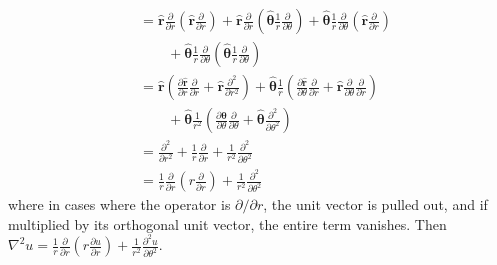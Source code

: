 \documentclass[a4paper]{article}
\begin{document}
\begin{enumerate}[label=(\alph*)]
\begin{align*}
		 & = \pmb{\hat{r}}\frac{\partial }{\partial r}\!\left( \pmb{\hat{r}}\frac{\partial }{\partial r} \right) + \pmb{\hat{r}}\frac{\partial }{\partial r}\!\left( \pmb{\hat{\theta}}\frac{1}{r}\frac{\partial }{\partial \theta} \right) + \pmb{\hat{\theta}}\frac{1}{r}\frac{\partial }{\partial \theta}\!\left( \pmb{\hat{r}}\frac{\partial }{\partial r} \right) \\ 
		 & \qquad + \pmb{\hat{\theta}}\frac{1}{r}\frac{\partial }{\partial \theta}\!\left( \pmb{\hat{\theta}}\frac{1}{r}\frac{\partial }{\partial \theta} \right) \\ 
		 & = \pmb{\hat{r}}\!\left( \frac{\partial \pmb{\hat{r}}}{\partial r}\frac{\partial }{\partial r} + \pmb{\hat{r}}\frac{\partial^2 }{\partial r^2} \right) + \pmb{\hat{\theta}}\frac{1}{r}\!\left( \frac{\partial \pmb{\hat{r}}}{\partial \theta}\frac{\partial }{\partial r} + \pmb{\hat{r}}\frac{\partial }{\partial \theta}\frac{\partial }{\partial r} \right) \\
		 & \qquad + \pmb{\hat{\theta}}\frac{1}{r^2}\!\left( \frac{\partial \pmb{\hat{\theta}}}{\partial \theta}\frac{\partial }{\partial \theta} + \pmb{\hat{\theta}}\frac{\partial^2 }{\partial \theta^2} \right) \\
		 & = \frac{\partial^2 }{\partial r^2} + \frac{1}{r}\frac{\partial }{\partial r} + \frac{1}{r^{2}}\frac{\partial^2 }{\partial \theta^2} \\
		 & = \frac{1}{r}\frac{\partial }{\partial r}\!\left( r \frac{\partial }{\partial r} \right) + \frac{1}{r^{2}}\frac{\partial^2 }{\partial \theta^2}
	\end{align*}
	where in cases where the operator is \( \partial / \partial r \), the unit vector is pulled out, and if multiplied by its orthogonal unit vector, the entire term vanishes. Then \( \nabla^{2}u = \frac{1}{r}\frac{\partial }{\partial r}\!\left( r \frac{\partial u}{\partial r} \right) + \frac{1}{r^{2}}\frac{\partial^2 u}{\partial \theta^2} \).
\end{enumerate}

\end{document}
